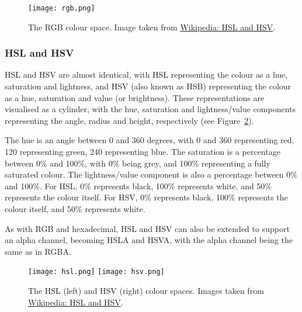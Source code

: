 \documentclass[../main.tex]{subfiles}
\begin{document}
            \begin{figure}[H]
                \centering
                \texttt{[image: rgb.png]}
                    \caption{The RGB colour space.
                        Image taken from \href{https://en.wikipedia.org/wiki/HSL_and_HSV}{Wikipedia:
                                HSL and HSV}.
                    }
                    \label{fig:rgb}
            \end{figure}

        \subsubsection{HSL and HSV}
            HSL and HSV are almost identical, with HSL representing the colour as a hue,
                saturation and lightness, and HSV (also known as HSB) representing the colour
                as a hue, saturation and value (or brightness).
            These representations are visualised as a cylinder, with the hue, saturation
                and lightness/value components representing the angle, radius and height,
                respectively (see Figure~\ref{fig:hsl}).

            The hue is an angle between 0 and 360 degrees, with 0 and 360 representing red,
                120 representing green, 240 representing blue.
            The saturation is a percentage between 0\% and 100\%, with 0\% being grey, and
                100\% representing a fully saturated colour.
            The lightness/value component is also a percentage between 0\% and 100\%.
            For HSL, 0\% represents black, 100\% represents white, and 50\% represents the
                colour itself.
            For HSV, 0\% represents black, 100\% represents the colour itself, and 50\%
                represents white.

            As with RGB and hexadecimal, HSL and HSV can also be extended to support an
                alpha channel, becoming HSLA and HSVA, with the alpha channel being the same as
                in RGBA.

            \begin{figure}[H]
                \centering
                \texttt{[image: hsl.png]}
                \texttt{[image: hsv.png]}
                    \caption{The HSL (left) and HSV (right) colour spaces.
                        Images taken from \href{https://en.wikipedia.org/wiki/HSL_and_HSV}{Wikipedia:
                                HSL and HSV}.
                    }
                    \label{fig:hsl}
            \end{figure}
\end{document}
